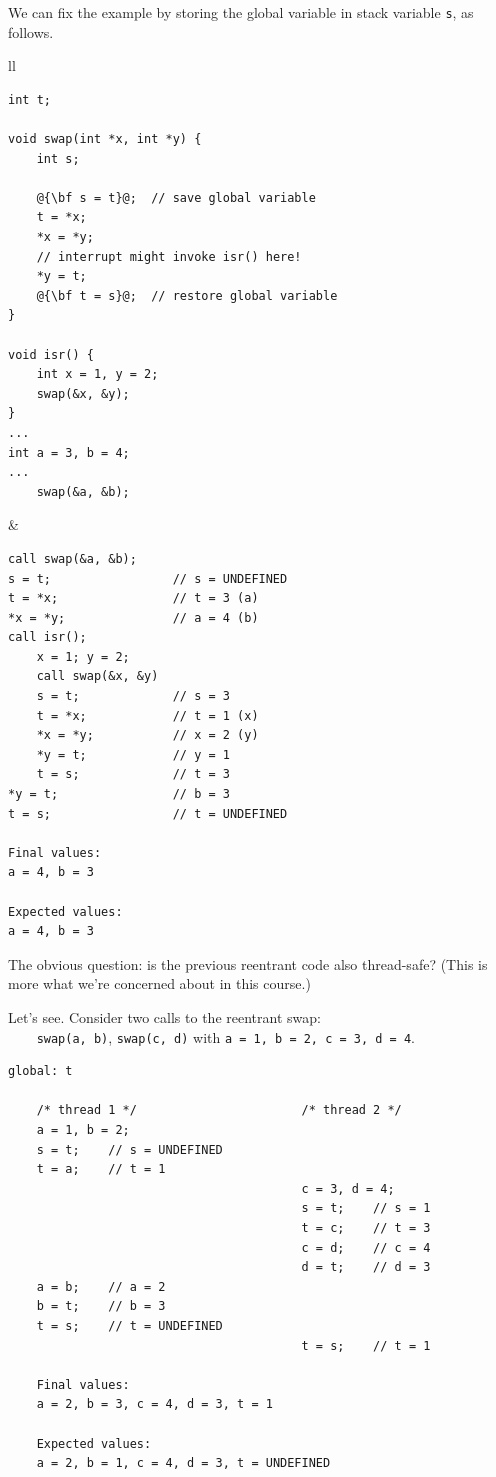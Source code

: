 \documentclass[11pt]{article}
\begin{document}
\newpage
We can fix the example by storing the global variable in stack variable
{\tt s}, as follows.
\begin{center}
\begin{tabular}{ll}
\begin{minipage}{.5\textwidth}
  \begin{lstlisting}[escapechar=@,basicstyle=\scriptsize]
int t;
 
void swap(int *x, int *y) {
    int s;
 
    @{\bf s = t}@;  // save global variable
    t = *x;
    *x = *y;
    // interrupt might invoke isr() here!
    *y = t;
    @{\bf t = s}@;  // restore global variable
}
 
void isr() {
    int x = 1, y = 2;
    swap(&x, &y);
}
...
int a = 3, b = 4;
...
    swap(&a, &b);
  \end{lstlisting}
\end{minipage} &
\begin{minipage}{.5\textwidth}
  \begin{lstlisting}[basicstyle=\scriptsize]
call swap(&a, &b);
s = t;                 // s = UNDEFINED
t = *x;                // t = 3 (a)
*x = *y;               // a = 4 (b)
call isr();
    x = 1; y = 2;
    call swap(&x, &y)
    s = t;             // s = 3
    t = *x;            // t = 1 (x)
    *x = *y;           // x = 2 (y)
    *y = t;            // y = 1
    t = s;             // t = 3
*y = t;                // b = 3
t = s;                 // t = UNDEFINED

Final values:
a = 4, b = 3

Expected values:
a = 4, b = 3
  \end{lstlisting}
\end{minipage}
\end{tabular}
\end{center}

The obvious question: is the previous reentrant code also thread-safe?
(This is more what we're concerned about in this course.)

  Let's see. Consider two calls to the reentrant swap:\\ \verb+    swap(a, b)+, {\tt swap(c, d)} with {\tt a = 1, b = 2, c = 3, d = 4}.

  \begin{lstlisting}[basicstyle=\scriptsize]
    global: t

    /* thread 1 */                       /* thread 2 */
    a = 1, b = 2;
    s = t;    // s = UNDEFINED
    t = a;    // t = 1
                                         c = 3, d = 4;
                                         s = t;    // s = 1
                                         t = c;    // t = 3
                                         c = d;    // c = 4
                                         d = t;    // d = 3
    a = b;    // a = 2
    b = t;    // b = 3
    t = s;    // t = UNDEFINED
                                         t = s;    // t = 1

    Final values:
    a = 2, b = 3, c = 4, d = 3, t = 1

    Expected values:
    a = 2, b = 1, c = 4, d = 3, t = UNDEFINED
  \end{lstlisting}
\end{document}
